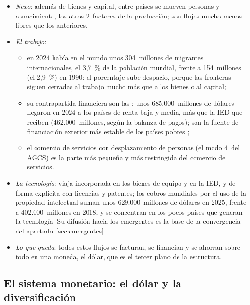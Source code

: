 \documentclass[11pt]{article}
\begin{document}
\begin{itemize}
\item \emph{Nexo}: además de bienes y capital, entre países se mueven personas y conocimiento, los otros 2~factores de la producción; son flujos mucho menos libres que los anteriores.
\item \emph{El trabajo}:
  \begin{itemize}
  \item en 2024 había en el mundo unos 304~millones de migrantes internacionales, el 3,7~\% de la población mundial, frente a 154~millones (el 2,9~\%) en 1990\nocite{ONU2025Migrantes}: el porcentaje sube despacio, porque las fronteras siguen cerradas al trabajo mucho más que a los bienes o al capital;
  \item su contrapartida financiera son las : unos 685.000~millones de dólares llegaron en 2024 a los países de renta baja y media, más que la IED que reciben (462.000~millones, según la balanza de pagos); son la fuente de financiación exterior más estable de los países pobres\nocite{BM2026WDIRemesas} ;
  \item el comercio de servicios con desplazamiento de personas (el modo 4~del AGCS) es la parte más pequeña y más restringida del comercio de servicios.
  \end{itemize}
\item \emph{La tecnología}: viaja incorporada en los bienes de equipo y en la IED, y de forma explícita con licencias y patentes; los cobros mundiales por el uso de la propiedad intelectual suman unos 629.000~millones de dólares en 2025, frente a 402.000~millones en 2018, y se concentran en los pocos países que generan la tecnología\nocite{BM2026WDIRoyalties}. Su difusión hacia los emergentes es la base de la convergencia del apartado~\ref{sec:emergentes}.
\item \emph{Lo que queda}: todos estos flujos se facturan, se financian y se ahorran sobre todo en una moneda, el dólar, que es el tercer plano de la estructura.
\end{itemize}

\subsection{El sistema monetario: el dólar y la diversificación}\label{sec:monetario}
\end{document}
